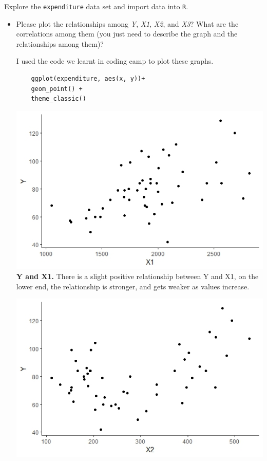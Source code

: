 \documentclass[12pt,letterpaper]{article}
\begin{document}
\vspace{.5cm}
\noindent Explore the \texttt{expenditure} data set and import data into \texttt{R}.
\vspace{.5cm}
\begin{itemize}

\item
Please plot the relationships among \emph{Y}, \emph{X1}, \emph{X2}, and \emph{X3}? What are the correlations among them (you just need to describe the graph and the relationships among them)?

I used the code we learnt in coding camp to plot these graphs.
\begin{verbatim}
	ggplot(expenditure, aes(x, y))+
	geom_point() +
	theme_classic()
\end{verbatim}

\includegraphics{YandX1}
\\
\textbf{Y and X1.} There is a slight positive relationship between Y and X1, on the lower end, the relationship is stronger, and gets weaker as values increase.
\vspace{.5cm}
\newpage

\includegraphics{YandX2}


\end{itemize}
\end{document}
